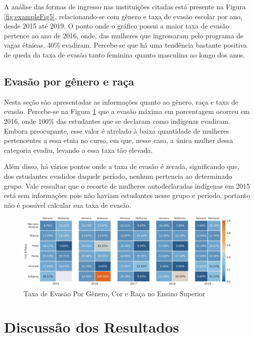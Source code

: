 \documentclass[a4paper]{article}
\begin{document}
A análise das formas de ingresso nas instituições citadas está presente na Figura \ref{fig:exampleFig5}, relacionando-se com gênero e taxa de evasão escolar por ano, desde 2015 até 2019. O ponto onde o gráfico possui a maior taxa de evasão pertence ao ano de 2016, onde, das mulheres que ingressaram pelo programa de vagas étnicas, 40\% evadiram. Percebe-se que há uma tendência bastante positiva de queda da taxa de evasão tanto feminina quanto masculina ao longo dos anos.





\subsection{Evasão por gênero e raça}\label{graf:generoeraca}

Nesta seção são apresentadas as informações quanto ao gênero, raça e taxa de evasão. Percebe-se na Figura \ref{fig:exampleFig6} que a evasão máxima em porcentagem ocorreu em 2016, onde 100\% das estudantes que se declaram como indígenas evadiram. Embora preocupante, esse valor é atrelado à baixa quantidade de mulheres pertencentes a essa etnia no curso, em que, nesse caso, a única mulher dessa categoria evadiu, levando a essa taxa tão elevada. 

Além disso, há vários pontos onde a taxa de evasão é zerada, significando que, dos estudantes evadidos daquele período, nenhum pertencia ao determinado grupo. Vale ressaltar que o recorte de mulheres autodeclaradas indígenas em 2015 está sem informações pois não haviam estudantes nesse grupo e período, portanto não é possível calcular sua taxa de evasão. 

\begin{figure}[ht]
\centering
\includegraphics[width=1\textwidth]{Evasão por gênero e raca.png}
\caption{Taxa de Evasão Por Gênero, Cor e Raça no Ensino Superior}
\label{fig:exampleFig6}
\end{figure}




\section{Discussão dos Resultados}\label{discussaoresultados}
\end{document}
